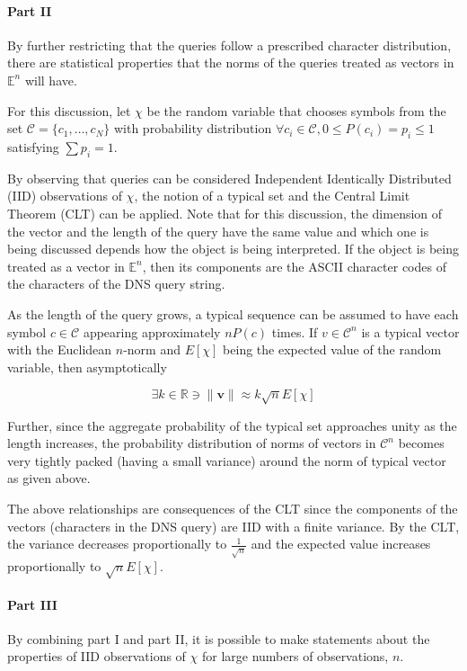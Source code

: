 \documentclass[12pt]{report}
\theoremstyle{remark}
\theoremstyle{definition}
\theoremstyle{definition}
\theoremstyle{definition}
\begin{document}
\paragraph{Part II} By further restricting that the queries follow a prescribed
character distribution, there are statistical properties that the norms of the
queries treated as vectors in $\mathbb E^n$ will have.

For this discussion, let $\chi$ be the random variable that chooses symbols from
the set $\mathcal C=\{c_1,\ldots,c_N\}$ with probability distribution $\forall c_i\in\mathcal C,
0\leq P(c_i)=p_i\leq1$ satisfying $\sum{p_i}=1$.

By observing that queries can be considered Independent Identically Distributed
(IID) observations of $\chi$, the notion of a typical set and the Central Limit 
Theorem (CLT) can be applied. Note that for this discussion, the dimension of
the vector and the length of the query have the same value and which one is
being discussed depends how the object is being interpreted. If the object is
being treated as a vector in $\mathbb E^n$, then its components are the ASCII
character codes of the characters of the DNS query string.

As the length of the query grows, a typical sequence can be assumed to have each
symbol $c\in\mathcal C$ appearing approximately $nP(c)$ times. If $v\in\mathcal
C^n$ is a typical vector with the Euclidean $n$-norm and $E[\chi]$
being the expected value of the random variable, then asymptotically

\begin{equation}
\label{dnssampling-evgrowth-eq}
\exists k\in\mathbb R \ni \|\mathbf v\|\approx k\sqrt n E[\chi]
\end{equation}

Further, since the aggregate probability of the typical set approaches unity as
the length increases, the probability distribution of norms of vectors in
$\mathcal C^n$ becomes very tightly packed (having a small variance) around the
norm of typical vector as given above.

The above relationships are consequences of the CLT
since the components of the vectors (characters in the DNS query) are IID with a
finite variance. By the CLT, the variance decreases proportionally to
$\frac{1}{\sqrt n}$ and the expected value increases proportionally to
$\sqrt{n}E[\chi]$.

\paragraph{Part III} By combining part I and part II, it is possible to make
statements about the properties of IID observations of $\chi$ for large numbers
of observations, $n$.
\end{document}
